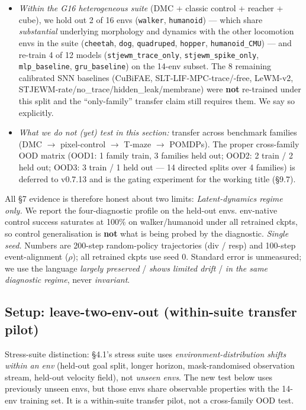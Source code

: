 \documentclass{article}
\begin{document}
\begin{itemize}
\item \emph{Within the G16 heterogeneous suite} (DMC + classic control + reacher + cube), we hold
out 2 of 16 envs (\texttt{walker}, \texttt{humanoid}) --- which share \emph{substantial} underlying
morphology and dynamics with the other locomotion envs in the suite
(\texttt{cheetah}, \texttt{dog}, \texttt{quadruped}, \texttt{hopper}, \texttt{humanoid\_CMU}) --- and re-train 4 of 12
models (\texttt{stjewm\_trace\_only}, \texttt{stjewm\_spike\_only}, \texttt{mlp\_baseline}, \texttt{gru\_baseline}) on
the 14-env subset. The 8 remaining calibrated SNN baselines
(CuBiFAE, SLT-LIF-MPC-trace/-free, LeWM-v2, STJEWM-rate/no\_trace/hidden\_leak/membrane)
were \textbf{not} re-trained under this split and the ``only-family'' transfer claim still
requires them. We say so explicitly.
\item \emph{What we do not (yet) test in this section:} transfer across benchmark families
(DMC $\to$ pixel-control $\to$ T-maze $\to$ POMDPs). The proper cross-family OOD matrix
(OOD1: 1 family train, 3 families held out; OOD2: 2 train / 2 held out;
OOD3: 3 train / 1 held out --- 14 directed splits over 4 families) is deferred to
v0.7.13 and is the gating experiment for the working title (\S9.7).
\end{itemize}

All §7 evidence is therefore honest about two limits:
\emph{Latent-dynamics regime only.} We report the four-diagnostic profile on the
held-out envs. env-native control success saturates at 100\% on walker/humanoid
under all retrained ckpts, so control generalisation is \textbf{not} what is being
probed by the diagnostic. \emph{Single seed.} Numbers are 200-step random-policy
trajectories (div / resp) and 100-step event-alignment ($\rho$); all retrained ckpts use
seed 0. Standard error is unmeasured; we use the language \emph{largely preserved} /
\emph{shows limited drift} / \emph{in the same diagnostic regime}, never \emph{invariant}.

\subsection{Setup: leave-two-env-out (within-suite transfer pilot)}

Stress-suite distinction: §4.1's stress suite uses \emph{environment-distribution shifts
within an env} (held-out goal split, longer horizon, mask-randomised observation
stream, held-out velocity field), not \emph{unseen envs}. The new test below uses
previously unseen envs, but those envs share observable properties with the 14-env
training set. It is a within-suite transfer pilot, not a cross-family OOD test.
\end{document}
